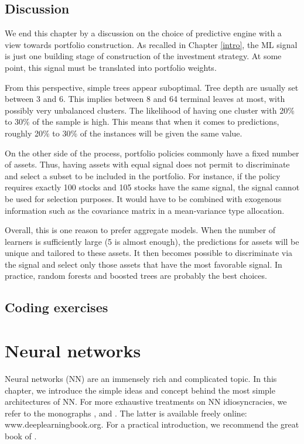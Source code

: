 \documentclass[]{krantz}
\theoremstyle{definition}
\theoremstyle{definition}
\theoremstyle{definition}
\theoremstyle{remark}
\begin{document}
\hypertarget{discussion}{%
\section{Discussion}\label{discussion}}

We end this chapter by a discussion on the choice of predictive engine
with a view towards portfolio construction. As recalled in Chapter
\ref{intro}, the ML signal is just one building stage of construction of
the investment strategy. At some point, this signal must be translated
into portfolio weights.

From this perspective, simple trees appear suboptimal. Tree depth are
usually set between 3 and 6. This implies between 8 and 64 terminal
leaves at most, with possibly very unbalanced clusters. The likelihood
of having one cluster with 20\% to 30\% of the sample is high. This
means that when it comes to predictions, roughly 20\% to 30\% of the
instances will be given the same value.

On the other side of the process, portfolio policies commonly have a
fixed number of assets. Thus, having assets with equal signal does not
permit to discriminate and select a subset to be included in the
portfolio. For instance, if the policy requires exactly 100 stocks and
105 stocks have the same signal, the signal cannot be used for selection
purposes. It would have to be combined with exogenous information such
as the covariance matrix in a mean-variance type allocation.

Overall, this is one reason to prefer aggregate models. When the number
of learners is sufficiently large (5 is almost enough), the predictions
for assets will be unique and tailored to these assets. It then becomes
possible to discriminate via the signal and select only those assets
that have the most favorable signal. In practice, random forests and
boosted trees are probably the best choices.

\hypertarget{coding-exercises-3}{%
\section{Coding exercises}\label{coding-exercises-3}}

\hypertarget{NN}{%
\chapter{Neural networks}\label{NN}}

Neural networks (NN) are an immensely rich and complicated topic. In
this chapter, we introduce the simple ideas and concept behind the most
simple architectures of NN. For more exhaustive treatments on NN
idiosyncracies, we refer to the monographs \citet{haykin2009neural},
\citet{du2013neural} and \citet{goodfellow2016deep}. The latter is
available freely online: www.deeplearningbook.org. For a practical
introduction, we recommend the great book of \citet{chollet2017deep}.
\end{document}
